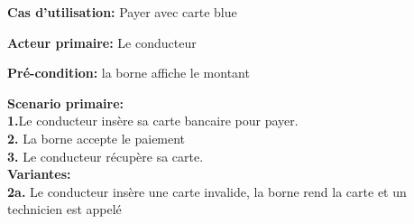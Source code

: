 \textbf{Cas d'utilisation:} Payer avec carte blue

\textbf{Acteur primaire:} Le conducteur


\textbf{Pré-condition: } la borne affiche le montant

 

\textbf{Scenario primaire: } \\
    \textbf{1.}Le conducteur insère sa carte bancaire pour payer. \\ %
    \textbf{2.} La borne accepte le paiement \\
    \textbf{3.} Le conducteur récupère sa carte.\\

\textbf{Variantes:}\\
    \textbf{2a.} Le conducteur insère une carte invalide, la borne rend la carte et un technicien est appelé\\
    

